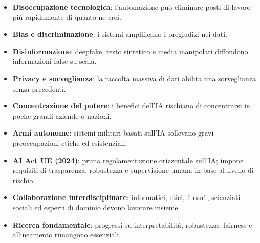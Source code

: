 \begin{warnbox}
\begin{itemize}
    \item \textbf{Disoccupazione tecnologica}: l'automazione pu\`o eliminare posti di lavoro pi\`u rapidamente di quanto ne crei.
    \item \textbf{Bias e discriminazione}: i sistemi amplificano i pregiudizi nei dati.
    \item \textbf{Disinformazione}: deepfake, testo sintetico e media manipolati diffondono informazioni false su scala.
    \item \textbf{Privacy e sorveglianza}: la raccolta massiva di dati abilita una sorveglianza senza precedenti.
    \item \textbf{Concentrazione del potere}: i benefici dell'IA rischiano di concentrarsi in poche grandi aziende o nazioni.
    \item \textbf{Armi autonome}: sistemi militari basati sull'IA sollevano gravi preoccupazioni etiche ed esistenziali.
\end{itemize}
\end{warnbox}

\begin{itemize}
    \item \textbf{AI Act UE (2024)}: prima regolamentazione orizzontale sull'IA; impone requisiti di trasparenza, robustezza e supervisione umana in base al livello di rischio.
    \item \textbf{Collaborazione interdisciplinare}: informatici, etici, filosofi, scienziati sociali ed esperti di dominio devono lavorare insieme.
    \item \textbf{Ricerca fondamentale}: progressi su interpretabilit\`a, robustezza, fairness e allineamento rimangono essenziali.
\end{itemize}
